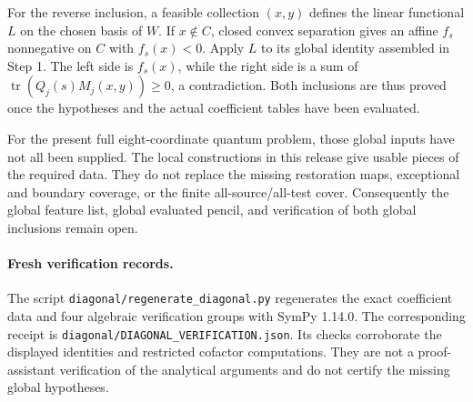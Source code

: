 For the reverse inclusion, a feasible collection $(x,y)$ defines
the linear functional $L$ on the chosen basis of $W$. If $x\notin C$,
closed convex separation gives an affine $f_s$ nonnegative on $C$
with $f_s(x)<0$. Apply $L$ to its global identity assembled in
Step 1. The left side is $f_s(x)$, while the right side is a sum of
$\operatorname{tr}(Q_j(s)M_j(x,y))\ge0$, a contradiction.
Both inclusions are thus proved once the hypotheses and the actual
coefficient tables have been evaluated.

For the present full eight-coordinate quantum problem, those global
inputs have not all been supplied. The local constructions in this
release give usable pieces of the required data. They do not replace
the missing restoration maps, exceptional and boundary coverage, or
the finite all-source/all-test cover. Consequently the global feature
list, global evaluated pencil, and verification of both global
inclusions remain open.

\paragraph{Fresh verification records.}
The script \nolinkurl{diagonal/regenerate_diagonal.py} regenerates
the exact coefficient data and four algebraic verification groups
with SymPy 1.14.0. The corresponding receipt is
\nolinkurl{diagonal/DIAGONAL_VERIFICATION.json}. Its checks corroborate
the displayed identities and restricted cofactor computations. They
are not a proof-assistant verification of the analytical arguments
and do not certify the missing global hypotheses.
